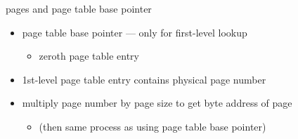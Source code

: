\begin{frame}{pages and page table base pointer}
    \begin{itemize}
    \item page table base pointer --- only for first-level lookup
        \begin{itemize}
        \item zeroth page table entry
        \end{itemize}
    \item 1st-level page table entry contains physical page number
    \item multiply page number by page size to get byte address of page
    \begin{itemize}
        \item (then same process as using page table base pointer)
    \end{itemize}
    \end{itemize}
\end{frame}

